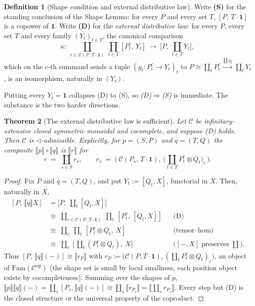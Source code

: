 \documentclass[11pt]{amsart}
\theoremstyle{plain}
\newtheorem{theorem}{Theorem}[section]
\theoremstyle{definition}
\newtheorem{definition}[theorem]{Definition}
\newcommand{\C}{\mathcal{C}}
\newcommand{\Fam}{\mathrm{Fam}}
\newcommand{\ext}[1]{\llbracket #1 \rrbracket}
\newcommand{\op}{\mathrm{op}}
\newcommand{\comp}{\mathbin{\triangleleft}}
\newcommand{\one}{\mathbf{1}}
\begin{document}
\begin{definition}[Shape condition and external distributive law]\label{def:SD}
Write \textbf{(S)} for the standing conclusion of the Shape Lemma: for every $P$ and every set $T$,
$[P,\,T\cdot\one]$ is a copower of $\one$. Write \textbf{(D)} for the \emph{external distributive law}:
for every $P$, every set $T$ and every family $(Y_t)_{t\in T}$, the canonical comparison
\[
   \kappa:\ \coprod_{c\in\C(P,\,T\cdot\one)}\ \prod_{t\in T}[P^c_t,\,Y_t]
   \ \longrightarrow\ \Big[P,\ \coprod_{t\in T}Y_t\Big],
\]
which on the $c$-th summand sends a tuple $(g_t:P^c_t\to Y_t)_t$ to
$P\cong\coprod_t P^c_t\xrightarrow{\coprod g_t}\coprod_t Y_t$, is an isomorphism, naturally in
$(Y_t)$.
\end{definition}

Putting every $Y_t=\one$ collapses (D) to (S), so \emph{(D)}$\Rightarrow$\emph{(S)} is immediate. The
substance is the two harder directions.

\begin{theorem}[The external distributive law is sufficient]\label{thm:Dsuff}
Let $\C$ be infinitary-extensive closed symmetric monoidal and cocomplete, and suppose \emph{(D)}
holds. Then $\C$ is $\comp$-admissible. Explicitly, for $p=(S,P)$ and $q=(T,Q)$ the composite
$\ext p\circ\ext q$ is $\ext{r}$ for
\[
   r\;=\;\coprod_{s\in S} r_s,\qquad
   r_s\;=\;\Big(\,\C(P_s,\,T\cdot\one),\ \big(\textstyle\coprod_{t\in T}P^c_t\otimes Q_t\big)_{c}\,\Big).
\]
\end{theorem}
\begin{proof}
Fix $P$ and $q=(T,Q)$, and put $Y_t:=[Q_t,X]$, functorial in $X$. Then, naturally in $X$,
\[
\begin{aligned}
   [P,\,\ext q X]
   &=\Big[P,\ \coprod_{t}[Q_t,X]\Big]\\
   &\cong\;\coprod_{c\in\C(P,\,T\cdot\one)}\ \prod_{t}\,[P^c_t,\,[Q_t,X]]
     &&\text{(D)}\\
   &\cong\;\coprod_{c}\ \prod_{t}\,[P^c_t\otimes Q_t,\ X]
     &&\text{(tensor--hom)}\\
   &\cong\;\coprod_{c}\ \Big[\,\coprod_{t}(P^c_t\otimes Q_t),\ X\Big]
     &&\big([-,X]\text{ preserves }\coprod\big).
\end{aligned}
\]
Thus $[P,\,\ext q(-)]\cong\ext{r_P}$ with $r_P:=\big(\C(P,T\cdot\one),(\coprod_t P^c_t\otimes Q_t)_c\big)$,
an object of $\Fam(\C^{\op})$ (the shape set is small by local smallness, each position object exists by
cocompleteness). Summing over the shapes of $p$,
$\ext p\ext q(-)=\coprod_s[P_s,\ext q(-)]\cong\coprod_s\ext{r_{P_s}}=\ext{\coprod_s r_{P_s}}$. Every
step but (D) is the closed structure or the universal property of the coproduct.
\end{proof}
\end{document}
